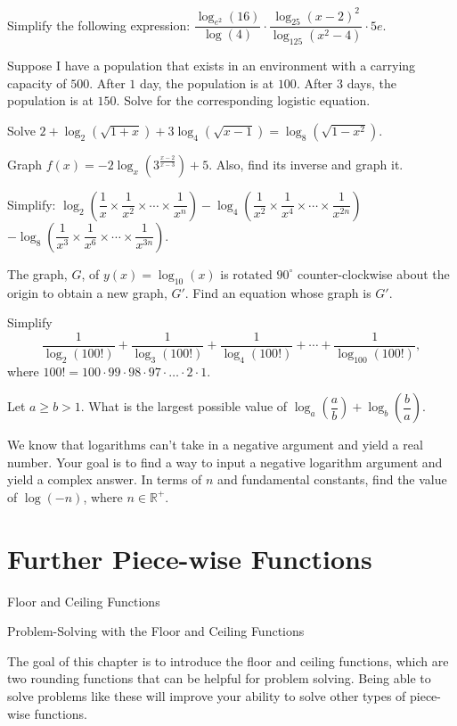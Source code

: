 \documentclass[lang=en,11pt]{elegantbook}
\begin{document}
\begin{challengeset}
\item Simplify the following expression: $\dfrac{\log_{e^2}(16)}{\log(4)}\cdot \dfrac{\log_{25}(x-2)^2}{\log_{125}(x^2-4)}\cdot 5e$.\vspace{2mm}
\item Suppose I have a population that exists in an environment with a carrying capacity of $500$. After $1$ day, the population is at $100$. After $3$ days, the population is at $150$. Solve for the corresponding logistic equation. 
\item Solve $2+\log_2(\sqrt{1+x})+3\log_4(\sqrt{x-1})=\log_8(\sqrt{1-x^2})$.\vspace{2mm}
\item Graph $f(x)=-2\log_x\left(3^{\frac{x-2}{x-3}}\right)+5$.  Also, find its inverse and graph it.\vspace{2mm}
\item Simplify: $\log_2\left(\dfrac{1}{x}\times \dfrac{1}{x^2}\times\cdots\times \dfrac{1}{x^n}\right)-\log_4\left(\dfrac{1}{x^2}\times \dfrac{1}{x^4}\times\cdots\times \dfrac{1}{x^{2n}}\right)$ \newline $-\log_8\left(\dfrac{1}{x^3}\times \dfrac{1}{x^6}\times\cdots\times \dfrac{1}{x^{3n}}\right).$ \vspace{2mm}
\item The graph, $G$, of $y(x)=\log_{10}(x)$ is rotated $90^{\circ}$ counter-clockwise about the origin to obtain a new graph, $G'$.  Find an equation whose graph is $G'$.
\item Simplify $$\dfrac{1}{\log_2(100!)}+\dfrac{1}{\log_3(100!)}+\dfrac{1}{\log_4(100!)}+\cdots+\dfrac{1}{\log_{100}(100!)},$$ where $100!=100\cdot 99\cdot 98\cdot 97\cdot \ldots \cdot 2\cdot 1.$ \vspace{2mm}
\item Let $a\geq b>1$. What is the largest possible value of $\log_a\left(\dfrac{a}{b}\right)+\log_b\left(\dfrac{b}{a}\right)$. \vspace{2mm}
\item We know that logarithms can't take in a negative argument and yield a real number.  Your goal is to find a way to input a negative logarithm argument and yield a complex answer.  In terms of $n$ and fundamental constants, find the value of $\log(-n)$, where $n\in\mathbb{R}^+$.
\end{challengeset}

\chapter{Further Piece-wise Functions}
\begin{introduction}[Contents]
\item Floor and Ceiling Functions
\item Problem-Solving with the Floor and Ceiling Functions
\end{introduction}
\noindent The goal of this chapter is to introduce the floor and ceiling functions, which are two rounding functions that can be helpful for problem solving.  Being able to solve problems like these will improve your ability to solve other types of piece-wise functions.
\end{document}
